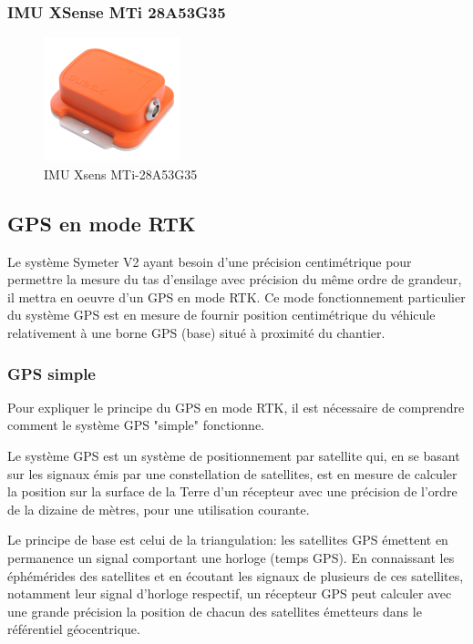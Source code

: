 \documentclass[12pt,a4paper]{report}
\begin{document}
		\subsubsection{IMU XSense MTi 28A53G35}
		
		\begin{figure}[h!]
			\centering
			\includegraphics[width=0.3\linewidth]{img/150px-Mti}
			\caption[mti]{IMU Xsens MTi-28A53G35}
			\label{fig:150px-mti}
		\end{figure}
		
		
		\subsection{GPS en mode RTK}
		
		Le système Symeter V2 ayant besoin d'une précision centimétrique pour permettre la mesure du tas d'ensilage avec précision du même ordre de grandeur, il mettra en oeuvre d'un GPS en mode RTK. Ce mode fonctionnement particulier du système GPS est en mesure de fournir position centimétrique du véhicule relativement à une borne GPS (base) situé à proximité du chantier.
		
		\subsubsection{GPS simple}
		Pour expliquer le principe du GPS en mode RTK, il est nécessaire de comprendre comment le système GPS "simple" fonctionne. 
		
		\para Le système GPS est un système de positionnement par satellite qui, en se basant sur les signaux émis par une constellation de satellites, est en mesure de calculer la position sur la surface de la Terre d'un récepteur avec une précision de l'ordre de la dizaine de mètres, pour une utilisation courante.
		
		\para Le principe de base est celui de la triangulation: les satellites GPS émettent en permanence un signal comportant une horloge (temps GPS). En connaissant les éphémérides des satellites et en écoutant les signaux de plusieurs de ces satellites, notamment leur signal d'horloge respectif, un récepteur GPS peut calculer avec une grande précision la position de chacun des satellites émetteurs dans le référentiel géocentrique.
		
\end{document}
